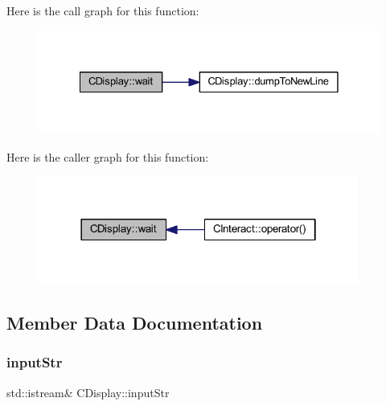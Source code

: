 Here is the call graph for this function\+:\nopagebreak
\begin{figure}[H]
\begin{center}
\leavevmode
\includegraphics[width=328pt]{class_c_display_a3af2fc29db30feeabc68ffea6fb8c13a_cgraph}
\end{center}
\end{figure}
Here is the caller graph for this function\+:\nopagebreak
\begin{figure}[H]
\begin{center}
\leavevmode
\includegraphics[width=298pt]{class_c_display_a3af2fc29db30feeabc68ffea6fb8c13a_icgraph}
\end{center}
\end{figure}


\subsection{Member Data Documentation}
\mbox{\label{class_c_display_ac154ae55121a2f931942af9d6519466f}} 
\subsubsection{\texorpdfstring{input\+Str}{inputStr}}
{\footnotesize\ttfamily std\+::istream\& C\+Display\+::input\+Str\hspace{0.3cm}{\ttfamily [protected]}}

\mbox{\label{class_c_display_ac275f884a9b9ff5e1cb3494128c7418a}} 
